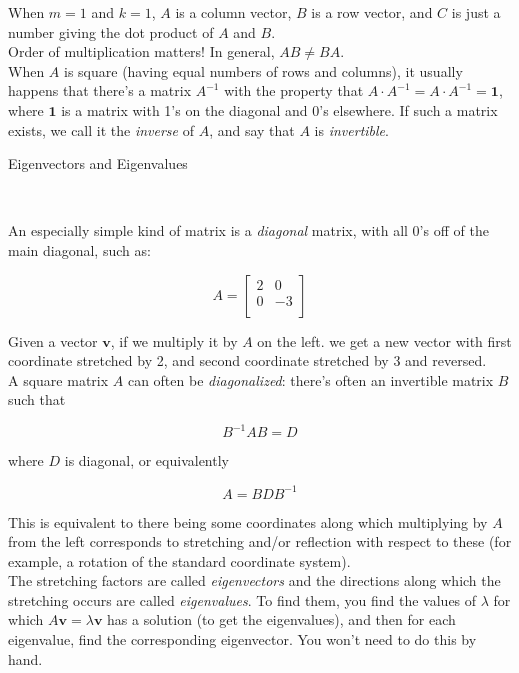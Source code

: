 \documentclass{article}
\begin{document}
When $m = 1$ and $k = 1$, $A$ is a column vector, $B$ is a row vector, and $C$ is just a number giving the dot product of $A$ and $B$. \\

Order of multiplication matters! In general, $AB \neq BA$. \\

When $A$ is square (having equal numbers of rows and columns), it usually happens that there's a matrix $A^{-1}$ with the property that $A \cdot A^{-1} = A \cdot A^{-1}  = \textbf{1}$, where $\textbf{1}$ is a matrix with 1's on the diagonal and 0's elsewhere. If such a matrix exists, we call it the \emph{inverse} of $A$, and say that $A$ is \emph{invertible}.\\

\centerline{\sc \large Eigenvectors and Eigenvalues}\


An especially simple kind of matrix is a \emph{diagonal} matrix, with all 0's off of the main diagonal, such as:

\[ A = \left[ \begin{array}{cc}
2 & 0 \\
0 & -3 \\
\end{array} \right]\] 

Given a vector $\textbf{v}$, if we multiply it by $A$ on the left. we get a new vector with first coordinate stretched by 2, and second coordinate stretched by 3 and reversed.\\

A  square matrix $A$  can often be \emph{diagonalized}: there's often an invertible matrix $B$ such that 

\[ B^{-1} A B  = D \] 
 
where $D$ is diagonal, or equivalently

\[ A  = B D B^{-1} \] 

This is equivalent to there being some coordinates along which multiplying by $A$ from the left corresponds to stretching and/or reflection with respect to these (for example, a rotation of the standard coordinate system).\\

The stretching factors are called \emph{eigenvectors} and the directions along which the stretching occurs are called \emph{eigenvalues}. To find them, you find the values of $\lambda$ for which $A \textbf{v} = \lambda \textbf{v}$ has a solution (to get the eigenvalues), and then for each eigenvalue, find the corresponding eigenvector. You won't need to do this by hand.\\
\end{document}
